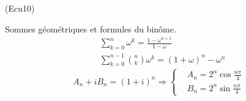 \begin{tiny}(Ecu10)\end{tiny} Sommes géométriques et formules du binôme.
\begin{align*}
  &\sum_{k=0}^n\omega^k = \frac{1-\omega^{n+1}}{1-\omega} \\
  &\sum_{k=0}^{n-1}\binom{n}{k}\omega^k = (1+\omega)^n - \omega^n
\end{align*}
\begin{displaymath}
  A_n + iB_n = (1+i)^n
\Rightarrow 
\left\lbrace 
\begin{aligned}
  &A_n = 2^n\cos\frac{n\pi}{4} \\ &B_n = 2^n\sin\frac{n\pi}{4}
\end{aligned}
\right. 
\end{displaymath}
